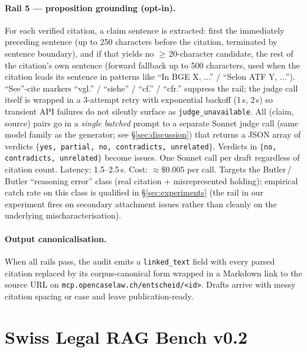 \documentclass[11pt,a4paper]{article}
\begin{document}
\paragraph{Rail 5 --- proposition grounding (opt-in).}
For each verified citation, a claim sentence is
extracted: first the immediately preceding sentence
(up to 250 characters before the citation, terminated
by sentence boundary), and if that yields no
$\geq\,$20-character candidate, the rest of the
citation's own sentence (forward fallback up to 500
characters, used when the citation leads its sentence
in patterns like ``In BGE X, ...'' / ``Selon ATF Y,
...'').  ``See''-cite markers ``vgl.'' / ``siehe'' /
``cf.'' / ``cfr.'' suppress the rail; the judge call
itself is wrapped in a 3-attempt retry with
exponential backoff (1\,s, 2\,s) so transient API
failures do not silently surface as
\texttt{judge\_unavailable}.  All (claim, source) pairs
go in a \emph{single batched} prompt to a separate
Sonnet judge call (same model family as the
generator; see \S\ref{sec:discussion}) that returns
a JSON array of verdicts
$\{$\texttt{yes, partial, no, contradicts,
unrelated}$\}$.  Verdicts in
$\{$\texttt{no, contradicts, unrelated}$\}$ become
issues.  One Sonnet call per draft regardless of
citation count.  Latency: 1.5--2.5\,s.  Cost:
$\approx\$0.005$ per call.  Targets the Butler\,/\,Butler
``reasoning error'' class (real citation +
misrepresented holding); empirical catch rate
on this class is qualified in \S\ref{sec:experiments}
(the rail in our experiment fires on secondary
attachment issues rather than cleanly on the
underlying mischaracterisation).

\paragraph{Output canonicalisation.}
When all rails pass, the audit emits a
\texttt{linked\_text} field with every parsed
citation replaced by its corpus-canonical form
wrapped in a Markdown link to the source URL on
\texttt{mcp.opencaselaw.ch/entscheid/<id>}.  Drafts
arrive with messy citation spacing or case and
leave publication-ready.


\section{Swiss Legal RAG Bench v0.2}
\label{sec:benchmark}
\end{document}
